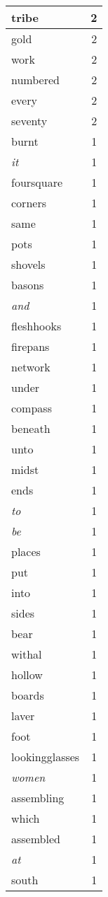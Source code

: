 \begin{center}
\begin{longtable}{l|r}
tribe & 2 \\ \hline
gold & 2 \\ \hline
work & 2 \\ \hline
numbered & 2 \\ \hline
every & 2 \\ \hline
seventy & 2 \\ \hline
burnt & 1 \\ \hline
\emph{it} & 1 \\ \hline
foursquare & 1 \\ \hline
corners & 1 \\ \hline
same & 1 \\ \hline
pots & 1 \\ \hline
shovels & 1 \\ \hline
basons & 1 \\ \hline
\emph{and} & 1 \\ \hline
fleshhooks & 1 \\ \hline
firepans & 1 \\ \hline
network & 1 \\ \hline
under & 1 \\ \hline
compass & 1 \\ \hline
beneath & 1 \\ \hline
unto & 1 \\ \hline
midst & 1 \\ \hline
ends & 1 \\ \hline
\emph{to} & 1 \\ \hline
\emph{be} & 1 \\ \hline
places & 1 \\ \hline
put & 1 \\ \hline
into & 1 \\ \hline
sides & 1 \\ \hline
bear & 1 \\ \hline
withal & 1 \\ \hline
hollow & 1 \\ \hline
boards & 1 \\ \hline
laver & 1 \\ \hline
foot & 1 \\ \hline
lookingglasses & 1 \\ \hline
\emph{women} & 1 \\ \hline
assembling & 1 \\ \hline
which & 1 \\ \hline
assembled & 1 \\ \hline
\emph{at} & 1 \\ \hline
south & 1 \\ \hline

\end{longtable}
\end{center}
